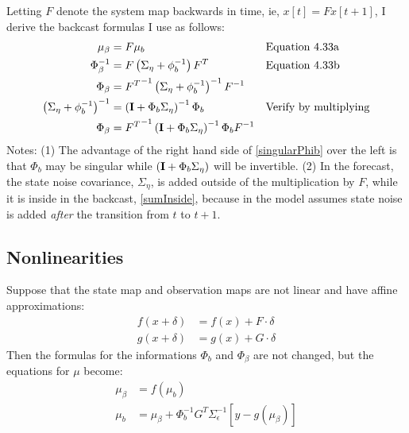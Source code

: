 \documentclass[prelim,showlabels]{book}
\newcommand{\id}{{\bf I}}
\begin{document}
Letting $F$ denote the system map backwards in time, ie, $x[t] = F
x[t+1]$, I derive the backcast formulas I use as follows:
\begin{align}
  \label{eq:linear_mu_beta}
  \mu_\beta &= F \mu_b && \text{Equation 4.33a}\\
  \label{sumInside}
  \Phi_\beta^{-1} &= F \left( \Sigma_\eta + \phi_b^{-1} \right) F^T &&
                                                                  \text{Equation
                                                                  4.33b}
  \\
  \Phi_\beta &= {F^T}^{-1}  \left( \Sigma_\eta + \phi_b^{-1}
               \right)^{-1} F^{-1} \\
  \label{singularPhib}
  \left(\Sigma_\eta + \phi_b^{-1} \right)^{-1} &= \left( \id + \Phi_b
                                                 \Sigma_\eta
                                                 \right)^{-1} \Phi_b
                       && \text{Verify by multiplying} \\
  \Phi_\beta &= {F^T}^{-1} \left( \id + \Phi_b \Sigma_\eta
               \right)^{-1} \Phi_b F^{-1}
\end{align}
Notes: (1) The advantage of the right hand side of \eqref{singularPhib}
over the left is that $\Phi_b$ may be singular while $\left( \id +
  \Phi_b \Sigma_\eta \right)$ will be invertible. (2) In the
forecast, the state noise covariance, $\Sigma_\eta$, is added outside of
the multiplication by $F$, while it is inside in the backcast, \eqref{sumInside},
because in the model assumes state noise is added \emph{after} the transition
from $t$ to $t+1$.

\subsection{Nonlinearities}
\label{sec:backNonlinear}

Suppose that the state map and observation maps are not linear and
have affine approximations:
\begin{align}
  f(x+\delta) &= f(x) + F\cdot \delta \\
  g(x+\delta) &= g(x) + G \cdot \delta
\end{align}
Then the formulas for the informations $\Phi_b$ and $\Phi_\beta$ are
not changed, but the equations for $\mu$ become:
\begin{align}
  \mu_\beta &= f(\mu_b) \\
  \mu_b &= \mu_\beta + \Phi_b^{-1} G^T \Sigma_\epsilon^{-1} \left[ y -
          g(\mu_\beta) \right]
\end{align}
\end{document}
